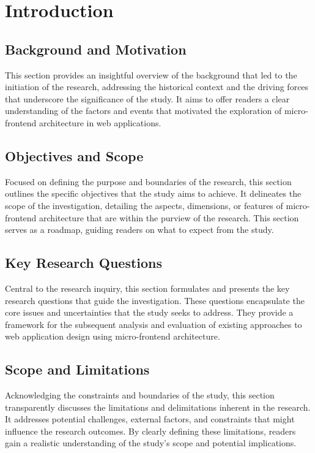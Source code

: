 \chapter{Introduction}
\label{chap:Introduction} 

\section{Background and Motivation}
This section provides an insightful overview of the background that led to the initiation of the research, addressing the historical context and the driving forces that underscore the significance of the study. It aims to offer readers a clear understanding of the factors and events that motivated the exploration of micro-frontend architecture in web applications.

\section{Objectives and Scope}
Focused on defining the purpose and boundaries of the research, this section outlines the specific objectives that the study aims to achieve. It delineates the scope of the investigation, detailing the aspects, dimensions, or features of micro-frontend architecture that are within the purview of the research. This section serves as a roadmap, guiding readers on what to expect from the study.

\section{Key Research Questions}
Central to the research inquiry, this section formulates and presents the key research questions that guide the investigation. These questions encapsulate the core issues and uncertainties that the study seeks to address. They provide a framework for the subsequent analysis and evaluation of existing approaches to web application design using micro-frontend architecture.

\section{Scope and Limitations}
Acknowledging the constraints and boundaries of the study, this section transparently discusses the limitations and delimitations inherent in the research. It addresses potential challenges, external factors, and constraints that might influence the research outcomes. By clearly defining these limitations, readers gain a realistic understanding of the study's scope and potential implications.

